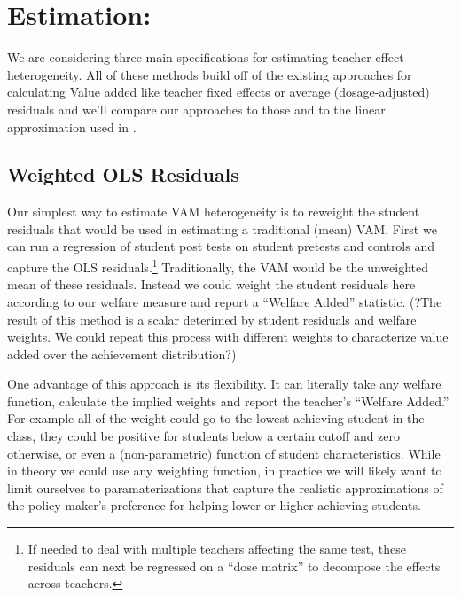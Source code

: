 \documentclass[letterpaper,12pt]{article}
\begin{document}
\section{Estimation:}
We are considering three main specifications for estimating teacher effect heterogeneity. All of these methods build off of the existing approaches for calculating Value added like teacher fixed effects or average (dosage-adjusted) residuals and we'll compare our approaches to those and to the linear approximation used in \citet{lockwood2007sensitivity}.


\subsection{Weighted OLS Residuals}
Our simplest way to estimate VAM heterogeneity is to reweight the student residuals that would be used in estimating a traditional (mean) VAM. First we can run a regression of student post tests on student pretests and controls and capture the OLS residuals.\footnote{If needed to deal with multiple teachers affecting the same test, these residuals can next be regressed on a ``dose matrix'' to decompose the effects across teachers.} Traditionally, the VAM would be the unweighted mean of these residuals. Instead  we could weight the student residuals here according to our welfare measure and report a ``Welfare Added'' statistic. (?The result of this method is a scalar deterimed by student residuals and welfare weights. We could repeat this process with different weights to characterize value added over the achievement distribution?)

One advantage of this approach is its flexibility. It can literally take any welfare function, calculate the implied weights and report the teacher's ``Welfare Added.'' For example all of the weight could go to the lowest achieving student in the class, they could be positive for students below a certain cutoff and zero otherwise, or even a (non-parametric) function of student characteristics.  While in theory we could use any weighting function, in practice we will likely want to limit ourselves to paramaterizations that capture the realistic approximations of the policy maker's preference for helping lower or higher achieving students. 
\end{document}
